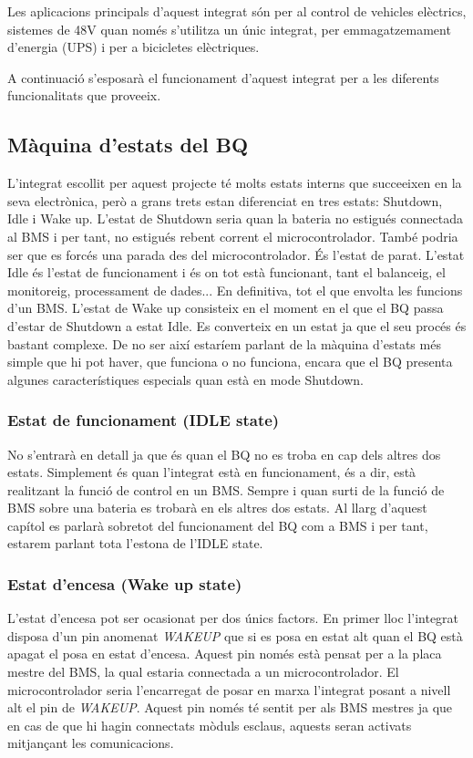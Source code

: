 Les aplicacions principals d'aquest integrat són per al control de vehicles elèctrics, sistemes de 48V quan només s'utilitza un únic integrat, per emmagatzemament d'energia (UPS) i per a bicicletes elèctriques.

A continuació s'esposarà el funcionament d'aquest integrat per a les diferents funcionalitats que proveeix.

\subsection{Màquina d'estats del BQ}

L'integrat escollit per aquest projecte té molts estats interns que succeeixen en la seva electrònica, però a grans trets estan diferenciat en tres estats: Shutdown, Idle i Wake up. L'estat de Shutdown seria quan la bateria no estigués connectada al BMS i per tant, no estigués rebent corrent el microcontrolador. També podria ser que es forcés una parada des del microcontrolador. És l'estat de parat. L'estat Idle és l'estat de funcionament i és on tot està funcionant, tant el balanceig, el monitoreig, processament de dades... En definitiva, tot el que envolta les funcions d'un BMS. L'estat de Wake up consisteix en el moment en el que el BQ passa d'estar de Shutdown a estat Idle. Es converteix en un estat ja que el seu procés és bastant complexe. De no ser així estaríem parlant de la màquina d'estats més simple que hi pot haver, que funciona o no funciona, encara que el BQ presenta algunes característiques especials quan està en mode Shutdown.

\subsubsection{Estat de funcionament (IDLE state)}
No s'entrarà en detall ja que és quan el BQ no es troba en cap dels altres dos estats. Simplement és quan l'integrat està en funcionament, és a dir, està realitzant la funció de control en un BMS. Sempre i quan surti de la funció de BMS sobre una bateria es trobarà en els altres dos estats. Al llarg d'aquest capítol es parlarà sobretot del funcionament del BQ com a BMS i per tant, estarem parlant tota l'estona de l'IDLE state.

\subsubsection{Estat d'encesa (Wake up state)}
L'estat d'encesa pot ser ocasionat per dos únics factors. En primer lloc l'integrat disposa d'un pin anomenat \textit{WAKEUP} que si es posa en estat alt quan el BQ està apagat el posa en estat d'encesa. Aquest pin només està pensat per a la placa mestre del BMS, la qual estaria connectada a un microcontrolador. El microcontrolador seria l'encarregat de posar en marxa l'integrat posant a nivell alt el pin de \textit{WAKEUP}. Aquest pin només té sentit per als BMS mestres ja que en cas de que hi hagin connectats mòduls esclaus, aquests seran activats mitjançant les comunicacions. 

